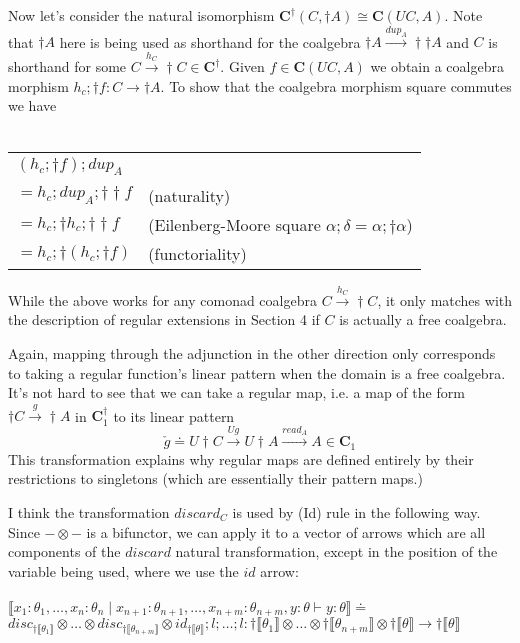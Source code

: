 \documentclass{article}
\newcommand{\mbf}{\mathbf}
\newcommand{\sem}[1]{\llbracket #1 \rrbracket}
\begin{document}
Now let's consider the natural isomorphism $\mbf{C}^\dagger(C,\dagger A) \cong \mbf{C}(UC,A)$. Note that
$\dagger A$ here is being used as shorthand for the coalgebra 
$\dagger A \overset{\mathit{dup}_A}{\longrightarrow} \dagger \dagger A$ and $C$ is shorthand for some $C \overset{h_C}{\longrightarrow} \dagger C \in \mathbf{C}^\dagger$. Given $f \in \mbf{C}(UC,A)$ we obtain a coalgebra morphism
$h_c;\dagger f : C \to \dagger A$. To show that the coalgebra morphism square commutes we have\\~\\
\begin{tabular}{ll}
$(h_c;\dagger f);\mathit{dup}_A$ & ~ \\
$= h_c;\mathit{dup}_A;\dagger \dagger f$ & (naturality)  \\
$= h_c;\dagger h_c;\dagger \dagger f$ & (Eilenberg-Moore square $\alpha;\delta = \alpha;\dagger\alpha$) \\
$= h_c;\dagger(h_c;\dagger f)$ & (functoriality)
\end{tabular}

While the above works for any comonad coalgebra $C \overset{h_C}{\longrightarrow} \dagger C$, it only matches with the description of regular extensions in Section 4 if $C$ is actually a free coalgebra.

Again, mapping through the adjunction in the other direction only corresponds to taking a regular function's linear pattern when the domain is a free coalgebra. It's not hard to see that 
we can take a regular map, i.e. a map of the form 
$\dagger C \overset{g}{\to} \dagger A$ in $\mathbf{C}^{\dagger}_1$ to 
its linear pattern $$\check{g} \doteq U \! \dagger \! C \overset{Ug}{\longrightarrow} U \! \dagger \! A \overset{\mathit{read}_A}{\longrightarrow} A \in \mbf{C}_1$$ This 
transformation explains why regular maps are defined entirely by their restrictions to singletons 
(which are essentially their pattern maps.) 

I think the transformation $\mathit{discard}_C$ is used by (Id) rule in the following way. Since $- \otimes -$ is
a bifunctor, we can apply it to a vector of arrows which are all components of the $\mathit{discard}$ natural transformation, except in the position of the variable being used, where we use the $\mathit{id}$ arrow:\\~\\
$\sem{x_1:\theta_1,\ldots,x_n:\theta_n \mid x_{n+1} : \theta_{n+1},\ldots,x_{n+m} : \theta_{n+m},y : \theta \vdash y : \theta} \doteq$\\
$\mathit{disc}_{\dagger \sem{\theta_1}} \otimes \ldots \otimes \mathit{disc}_{\dagger \sem{\theta_{n + m}}} \otimes \mathit{id}_{\dagger \sem{\theta}};l;\ldots;l
: \dagger \sem{\theta_1} \otimes \ldots \otimes \dagger \sem{\theta_{n+m}} \otimes \dagger \sem{\theta} \to \dagger \sem{\theta}$
\end{document}
